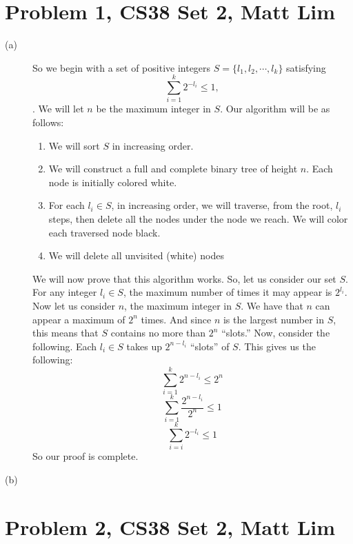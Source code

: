 \documentclass{article}
\begin{document}
\section*{Problem 1, CS38 Set 2, Matt Lim}
\begin{description}
    \item[(a)]
        So we begin with a set of positive integers $S = \{l_1,l_2, \cdots,
        l_k\}$
        satisfying
        \[\sum_{i=1}^k 2^{-l_i} \le 1,\]
        .
        We will let $n$ be the maximum integer in $S$. Our algorithm will be as follows:

        \begin{enumerate}
            \item We will sort $S$ in increasing order.
            \item We will construct a full and complete binary tree of height
                $n$. Each node is initially colored white.
            \item For each $l_i \in S$, in increasing order, we will traverse,
                from the root, $l_i$ steps, then delete all the nodes under the
                node we reach. We will color each traversed node black.
            \item We will delete all unvisited (white) nodes
        \end{enumerate}

        We will now prove that this algorithm works.
        So, let us consider our set $S$. For any integer $l_i \in S$, the
        maximum number of times it may appear is $2^{l_i}$. Now let us consider
        $n$, the maximum integer in $S$. We have that $n$ can appear a maximum
        of $2^n$ times. And since $n$ is the largest number in $S$, this means
        that $S$ contains no more than $2^n$ ``slots.'' Now, consider the
        following. Each $l_i \in S$ takes up $2^{n-l_i}$ ``slots'' of $S$. This
        gives us the following:
        \[ \sum_{i=1}^k 2^{n-l_i} \le 2^n \]
        \[ \sum_{i=1}^k \frac{2^{n-l_i}}{2^n} \le 1 \]
        \[ \sum_{i=i}^k 2^{-l_i} \le 1 \]
        So our proof is complete.
    \item[(b)]
\end{description}
\newpage

\section*{Problem 2, CS38 Set 2, Matt Lim}
\newpage
\end{document}
